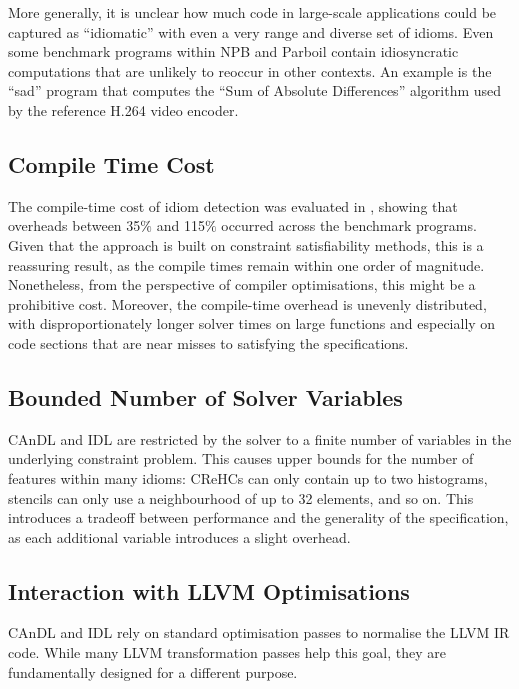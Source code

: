     More generally, it is unclear how much code in large-scale applications
    could be captured as ``idiomatic'' with even a very range and diverse set of
    idioms.
    Even some benchmark programs within NPB and Parboil contain idiosyncratic
    computations that are unlikely to reoccur in other contexts.
    An example is the ``sad'' program that computes the
    ``Sum of Absolute Differences'' algorithm used by the reference H.264 video
    encoder.

\subsection*{Compile Time Cost}

    The compile-time cost of idiom detection was evaluated in
    , showing that overheads between 35$\%$ and 115$\%$
    occurred across the benchmark programs.
    Given that the approach is built on constraint satisfiability methods, this
    is a reassuring result, as the compile times remain within one order of
    magnitude.
    Nonetheless, from the perspective of compiler optimisations, this might be
    a prohibitive cost.
    Moreover, the compile-time overhead is unevenly distributed, with
    disproportionately longer solver times on large functions and especially on
    code sections that are near misses to satisfying the specifications.

\subsection*{Bounded Number of Solver Variables}

    CAnDL and IDL are restricted by the solver to a finite number of variables
    in the underlying constraint problem.
    This causes upper bounds for the number of features within many idioms:
    CReHCs can only contain up to two histograms, stencils can only use a
    neighbourhood of up to 32 elements, and so on.
    This introduces a tradeoff between performance and the generality of the
    specification, as each additional variable introduces a slight overhead.

\subsection*{Interaction with LLVM Optimisations}

    CAnDL and IDL rely on standard optimisation passes to normalise the LLVM IR
    code.
    While many LLVM transformation passes help this goal, they are fundamentally
    designed for a different purpose.

